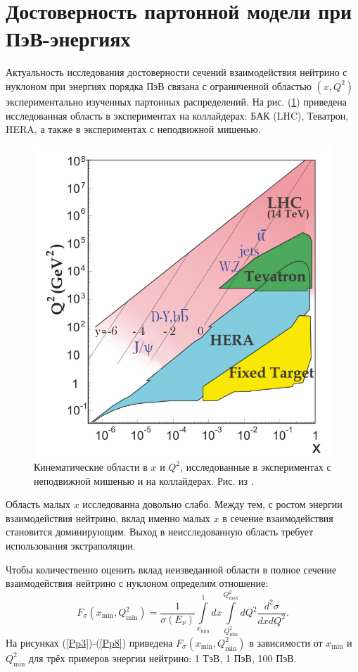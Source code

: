 \section{Достоверность партонной модели при ПэВ-энергиях}
Актуальность исследования достоверности сечений взаимодействия нейтрино с нуклоном при энергиях порядка ПэВ связана с ограниченной областью  $(x, Q^2)$ экспериментально изученных партонных распределений. На рис. (\ref{fig:xQ2_PDG}) приведена исследованная область в экспериментах на коллайдерах:   БАК (LHC), Теватрон, HERA, а также в экспериментах с неподвижной мишенью.  
\begin{figure}[!h]
\centering
\includegraphics[width=\linewidth]{images/NuProp/reald}
\caption{Кинематические области в $x$ и $Q^2$, исследованные в экспериментах с неподвижной мишенью и на коллайдерах. Рис. из \cite{ParticleDataGroup:2024cfk}.}
\label{fig:xQ2_PDG}
\end{figure}
Область малых $x$ исследованна довольно слабо. Между тем, с ростом энергии взаимодействия нейтрино, вклад именно малых $x$ в сечение взаимодействия становится доминирующим. Выход в неисследованную область требует использования экстраполяции. 

Чтобы количественно оценить вклад неизведанной области в полное сечение взаимодействия нейтрино с нуклоном  определим отношение: 
 \begin{equation}
     F_{\sigma}(x_\text{min},Q^2_\text{min}) = \frac{1}{\sigma(E_{\nu})}\int\limits_{x_\text{min}}^1dx\int\limits_{Q^2_\text{min}}^{Q^2_\text{max}}dQ^2\frac{d^2\sigma}{dxdQ^2}.
 \end{equation}
На рисунках (\ref{Pp3})-(\ref{Pp8}) приведена $F_{\sigma}(x_\text{min},Q^2_\text{min})$ в зависимости от $x_\text{min}$ и $Q^2_\text{min}$ для трёх примеров энергии нейтрино: 1 ТэВ, 1 ПэВ, 100 ПэВ. 
 

